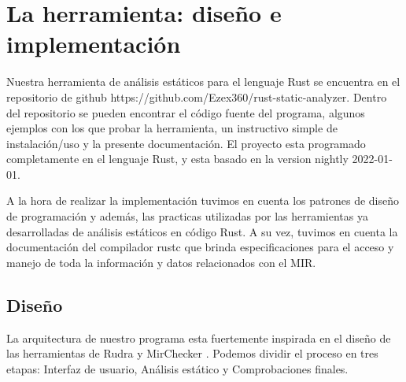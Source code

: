 \chapter{La herramienta: diseño e implementación}

Nuestra herramienta de análisis estáticos para el lenguaje Rust se encuentra en el repositorio de github https://github.com/Ezex360/rust-static-analyzer. Dentro del repositorio se pueden encontrar el código fuente del programa, algunos ejemplos con los que probar la herramienta, un instructivo simple de instalación/uso y la presente documentación.
El proyecto esta programado completamente en el lenguaje Rust, y esta basado en la version nightly 2022-01-01.

A la hora de realizar la implementación tuvimos en cuenta los patrones de diseño de programación \cite{ingienieriasoftware} y además, las practicas utilizadas por las herramientas ya desarrolladas de análisis estáticos en código Rust. A su vez, tuvimos en cuenta la documentación del compilador rustc \cite{rustcdevelopment} que brinda especificaciones para el acceso y manejo de toda la información y datos relacionados con el MIR.

\section{Diseño}

La arquitectura de nuestro programa esta fuertemente inspirada en el diseño de las herramientas de Rudra \cite{rudra} y MirChecker \cite{li2021mirchecker}. Podemos dividir el proceso en tres etapas: Interfaz de usuario, Análisis estático y Comprobaciones finales.

